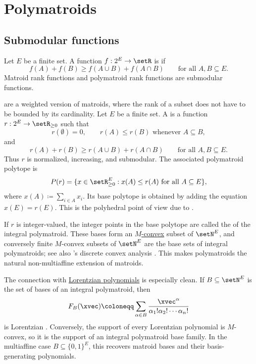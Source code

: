 \section[polymatroids]{Polymatroids}

\subsection[submodularFunction]{Submodular functions}

Let $E$ be a finite set.  A function $f:2^E\to\setR$ is
\label{submodular} if
\[
  f(A)+f(B) \geq f(A\cup B)+f(A\cap B)
  \qquad \text{for all } A,B\subseteq E.
\]
Matroid rank functions and polymatroid rank functions are submodular functions.


\label{polymatroid} are a weighted version of matroids,
where the rank of a subset does not have to be bounded by its cardinality.
Let $E$ be a finite set.  A
\label{polymatroidRankFunction} is a function
$r:2^E\to \setR_{\geq 0}$ such that
\[
  r(\emptyset)=0, \qquad
  r(A) \leq r(B) \text{ whenever } A\subseteq B,
\]
and
\[
  r(A)+r(B) \geq r(A\cup B)+r(A\cap B)
  \qquad \text{for all } A,B\subseteq E.
\]
Thus $r$ is normalized, increasing, and submodular.  The associated
polymatroid polytope is
\[
  P(r)=\{x\in \setR_{\geq 0}^E : x(A)\leq r(A)
  \text{ for all } A\subseteq E\},
\]
where $x(A)\coloneqq \sum_{i\in A} x_i$.  Its base polytope is obtained by
adding the equation $x(E)=r(E)$.  This is the polyhedral point of view due to
 \cite{Edmonds1970}.

If $r$ is integer-valued, the integer points in the base polytope are called
the \label{integralPolymatroidBase} of the integral polymatroid.
These bases form an
\hyperref[MConvexity]{$M$-convex} subset of $\setN^E$, and conversely
finite $M$-convex subsets of $\setN^E$ are the base sets of integral
polymatroids; see also 's discrete convex analysis
\cite{Murota2003}.  This makes polymatroids the natural non-multiaffine
extension of matroids.

The connection with \hyperref[lorentzianPolynomial]{Lorentzian polynomials}
is especially clean.  If $B\subseteq \setN^E$ is the set of bases of an
integral polymatroid, then
\[
  F_B(\xvec)\coloneqq
  \sum_{\alpha\in B}
  \frac{\xvec^\alpha}{\alpha_1!\alpha_2!\dotsm \alpha_n!}
\]
is Lorentzian \cite{BrandenHuh2020}.  Conversely, the support of every
Lorentzian polynomial is $M$-convex, so it is the support of an integral
polymatroid base family.  In the multiaffine case $B\subseteq\{0,1\}^E$,
this recovers matroid bases and their basis-generating polynomials.

